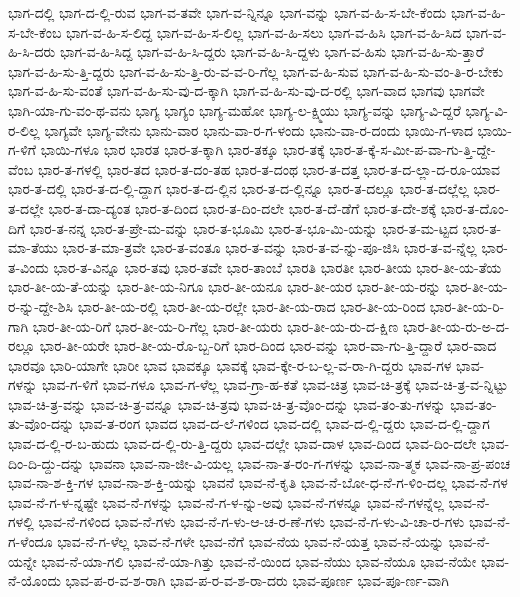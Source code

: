 {ಭಾಗ-ದಲ್ಲಿ
ಭಾಗ-ದ-ಲ್ಲಿ-ರುವ
ಭಾಗ-ವ-ತವೇ
ಭಾಗ-ವ-ನ್ನಿನ್ನೂ
ಭಾಗ-ವನ್ನು
ಭಾಗ-ವ-ಹಿ-ಸ-ಬೇ-ಕೆಂದು
ಭಾಗ-ವ-ಹಿ-ಸ-ಬೇ-ಕೆಂಬ
ಭಾಗ-ವ-ಹಿ-ಸ-ಲಿದ್ದ
ಭಾಗ-ವ-ಹಿ-ಸ-ಲಿಲ್ಲ
ಭಾಗ-ವ-ಹಿ-ಸಲು
ಭಾಗ-ವ-ಹಿಸಿ
ಭಾಗ-ವ-ಹಿ-ಸಿದ
ಭಾಗ-ವ-ಹಿ-ಸಿ-ದರು
ಭಾಗ-ವ-ಹಿ-ಸಿದ್ದ
ಭಾಗ-ವ-ಹಿ-ಸಿ-ದ್ದರು
ಭಾಗ-ವ-ಹಿ-ಸಿ-ದ್ದಳು
ಭಾಗ-ವ-ಹಿಸು
ಭಾಗ-ವ-ಹಿ-ಸು-ತ್ತಾರೆ
ಭಾಗ-ವ-ಹಿ-ಸು-ತ್ತಿ-ದ್ದರು
ಭಾಗ-ವ-ಹಿ-ಸು-ತ್ತಿ-ರು-ವ-ವ-ರಿ-ಗೆಲ್ಲ
ಭಾಗ-ವ-ಹಿ-ಸುವ
ಭಾಗ-ವ-ಹಿ-ಸು-ವಂ-ತಿ-ರ-ಬೇಕು
ಭಾಗ-ವ-ಹಿ-ಸು-ವಂತೆ
ಭಾಗ-ವ-ಹಿ-ಸು-ವು-ದ-ಕ್ಕಾಗಿ
ಭಾಗ-ವ-ಹಿ-ಸು-ವು-ದ-ರಲ್ಲಿ
ಭಾಗ-ವಾದ
ಭಾಗವು
ಭಾಗವೇ
ಭಾಗಿ-ಯಾ-ಗು-ವಂ-ಥ-ವನು
ಭಾಗ್ಯ
ಭಾಗ್ಯಂ
ಭಾಗ್ಯ-ಮಹೋ
ಭಾಗ್ಯ-ಲ-ಕ್ಷ್ಮಿಯು
ಭಾಗ್ಯ-ವನ್ನು
ಭಾಗ್ಯ-ವಿ-ದ್ದರೆ
ಭಾಗ್ಯ-ವಿ-ರ-ಲಿಲ್ಲ
ಭಾಗ್ಯವೇ
ಭಾಗ್ಯ-ವೇನು
ಭಾನು-ವಾರ
ಭಾನು-ವಾ-ರ-ಗ-ಳಂದು
ಭಾನು-ವಾ-ರ-ದಂದು
ಭಾಯಿ-ಗ-ಳಾದ
ಭಾಯಿ-ಗ-ಳಿಗೆ
ಭಾಯಿ-ಗಳೂ
ಭಾರ
ಭಾರತ
ಭಾರ-ತ-ಕ್ಕಾಗಿ
ಭಾರ-ತಕ್ಕೂ
ಭಾರ-ತಕ್ಕೆ
ಭಾರ-ತ-ಕ್ಕೆ-ಸ-ಮೀ-ಪ-ವಾ-ಗು-ತ್ತಿ-ದ್ದೇ-ವೆಂಬ
ಭಾರ-ತ-ಗಳಲ್ಲಿ
ಭಾರ-ತದ
ಭಾರ-ತ-ದಂ-ತಹ
ಭಾರ-ತ-ದಂಥ
ಭಾರ-ತ-ದತ್ತ
ಭಾರ-ತ-ದ-ಲ್ಲಾ-ದ-ರೂ-ಯಾವ
ಭಾರ-ತ-ದಲ್ಲಿ
ಭಾರ-ತ-ದ-ಲ್ಲಿ-ದ್ದಾಗ
ಭಾರ-ತ-ದ-ಲ್ಲಿನ
ಭಾರ-ತ-ದ-ಲ್ಲಿನ್ನೂ
ಭಾರ-ತ-ದಲ್ಲೂ
ಭಾರ-ತ-ದಲ್ಲೆಲ್ಲ
ಭಾರ-ತ-ದಲ್ಲೇ
ಭಾರ-ತ-ದಾ-ದ್ಯಂತ
ಭಾರ-ತ-ದಿಂದ
ಭಾರ-ತ-ದಿಂ-ದಲೇ
ಭಾರ-ತ-ದೆ-ಡೆಗೆ
ಭಾರ-ತ-ದೇ-ಶಕ್ಕೆ
ಭಾರ-ತ-ದೊಂ-ದಿಗೆ
ಭಾರ-ತ-ನನ್ನ
ಭಾರ-ತ-ಪ್ರೇ-ಮ-ವನ್ನು
ಭಾರ-ತ-ಭೂಮಿ
ಭಾರ-ತ-ಭೂ-ಮಿ-ಯನ್ನು
ಭಾರ-ತ-ಮ-ಟ್ಟದ
ಭಾರ-ತ-ಮಾ-ತೆಯು
ಭಾರ-ತ-ಮಾ-ತ್ರವೇ
ಭಾರ-ತ-ವಂತೂ
ಭಾರ-ತ-ವನ್ನು
ಭಾರ-ತ-ವ-ನ್ನು-ಪೂ-ಜಿಸಿ
ಭಾರ-ತ-ವ-ನ್ನೆಲ್ಲ
ಭಾರ-ತ-ವಿಂದು
ಭಾರ-ತ-ವಿನ್ನೂ
ಭಾರ-ತವು
ಭಾರ-ತವೇ
ಭಾರ-ತಾಂಬೆ
ಭಾರತಿ
ಭಾರತೀ
ಭಾರ-ತೀಯ
ಭಾರ-ತೀ-ಯ-ತೆಯ
ಭಾರ-ತೀ-ಯ-ತೆ-ಯನ್ನು
ಭಾರ-ತೀ-ಯ-ನಿಗೂ
ಭಾರ-ತೀ-ಯನೂ
ಭಾರ-ತೀ-ಯರ
ಭಾರ-ತೀ-ಯ-ರನ್ನು
ಭಾರ-ತೀ-ಯ-ರ-ನ್ನು-ದ್ದೇ-ಶಿಸಿ
ಭಾರ-ತೀ-ಯ-ರಲ್ಲಿ
ಭಾರ-ತೀ-ಯ-ರಲ್ಲೇ
ಭಾರ-ತೀ-ಯ-ರಾದ
ಭಾರ-ತೀ-ಯ-ರಿಂದ
ಭಾರ-ತೀ-ಯ-ರಿ-ಗಾಗಿ
ಭಾರ-ತೀ-ಯ-ರಿಗೆ
ಭಾರ-ತೀ-ಯ-ರಿ-ಗೆಲ್ಲ
ಭಾರ-ತೀ-ಯರು
ಭಾರ-ತೀ-ಯ-ರು-ದ-ಕ್ಷಿಣ
ಭಾರ-ತೀ-ಯ-ರು-ಅ-ದ-ರಲ್ಲೂ
ಭಾರ-ತೀ-ಯರೇ
ಭಾರ-ತೀ-ಯ-ರೊ-ಬ್ಬ-ರಿಗೆ
ಭಾರ-ದಿಂದ
ಭಾರ-ವನ್ನು
ಭಾರ-ವಾ-ಗು-ತ್ತಿ-ದ್ದಾರೆ
ಭಾರ-ವಾದ
ಭಾರವೂ
ಭಾರಿ-ಯಾಗೇ
ಭಾರೀ
ಭಾವ
ಭಾವಕ್ಕೂ
ಭಾವಕ್ಕೆ
ಭಾವ-ಕ್ಕೇ-ರ-ಬ-ಲ್ಲ-ವ-ರಾ-ಗಿ-ದ್ದರು
ಭಾವ-ಗಳ
ಭಾವ-ಗಳನ್ನು
ಭಾವ-ಗ-ಳಿಗೆ
ಭಾವ-ಗಳೂ
ಭಾವ-ಗ-ಳೆಲ್ಲ
ಭಾವ-ಗ್ರಾ-ಹ-ಕತೆ
ಭಾವ-ಚಿತ್ರ
ಭಾವ-ಚಿ-ತ್ರಕ್ಕೆ
ಭಾವ-ಚಿ-ತ್ರ-ವ-ನ್ನಿಟ್ಟು
ಭಾವ-ಚಿ-ತ್ರ-ವನ್ನು
ಭಾವ-ಚಿ-ತ್ರ-ವನ್ನೂ
ಭಾವ-ಚಿ-ತ್ರವು
ಭಾವ-ಚಿ-ತ್ರ-ವೊಂ-ದನ್ನು
ಭಾವ-ತಂ-ತು-ಗಳನ್ನು
ಭಾವ-ತಂ-ತು-ವೊಂ-ದನ್ನು
ಭಾವ-ತ-ರಂಗ
ಭಾವದ
ಭಾವ-ದ-ಲೆ-ಗಳಿಂದ
ಭಾವ-ದಲ್ಲಿ
ಭಾವ-ದ-ಲ್ಲಿ-ದ್ದರು
ಭಾವ-ದ-ಲ್ಲಿ-ದ್ದಾಗ
ಭಾವ-ದ-ಲ್ಲಿ-ರ-ಬ-ಹುದು
ಭಾವ-ದ-ಲ್ಲಿ-ರು-ತ್ತಿ-ದ್ದರು
ಭಾವ-ದಲ್ಲೇ
ಭಾವ-ದಾಳ
ಭಾವ-ದಿಂದ
ಭಾವ-ದಿಂ-ದಲೇ
ಭಾವ-ದಿಂ-ದಿ-ದ್ದು-ದನ್ನು
ಭಾವನಾ
ಭಾವ-ನಾ-ಜೀ-ವಿ-ಯಲ್ಲ
ಭಾವ-ನಾ-ತ-ರಂ-ಗ-ಗಳನ್ನು
ಭಾವ-ನಾ-ತ್ಮಕ
ಭಾವ-ನಾ-ಪ್ರ-ಪಂಚ
ಭಾವ-ನಾ-ಶ-ಕ್ತಿ-ಗಳ
ಭಾವ-ನಾ-ಶ-ಕ್ತಿ-ಯನ್ನು
ಭಾವನೆ
ಭಾವ-ನೆ-ಕೃತಿ
ಭಾವ-ನೆ-ಬೋ-ಧ-ನೆ-ಗ-ಳಿಂ-ದಲ್ಲ
ಭಾವ-ನೆ-ಗಳ
ಭಾವ-ನೆ-ಗ-ಳ-ನ್ನಷ್ಟೇ
ಭಾವ-ನೆ-ಗಳನ್ನು
ಭಾವ-ನೆ-ಗ-ಳ-ನ್ನು-ಅವು
ಭಾವ-ನೆ-ಗಳನ್ನೂ
ಭಾವ-ನೆ-ಗಳನ್ನೆಲ್ಲ
ಭಾವ-ನೆ-ಗಳಲ್ಲಿ
ಭಾವ-ನೆ-ಗಳಿಂದ
ಭಾವ-ನೆ-ಗಳು
ಭಾವ-ನೆ-ಗ-ಳು-ಆ-ಚ-ರ-ಣೆ-ಗಳು
ಭಾವ-ನೆ-ಗ-ಳು-ವಿ-ಚಾ-ರ-ಗಳು
ಭಾವ-ನೆ-ಗ-ಳೆಂದೂ
ಭಾವ-ನೆ-ಗ-ಳೆಲ್ಲ
ಭಾವ-ನೆ-ಗಳೇ
ಭಾವ-ನೆಗೆ
ಭಾವ-ನೆಯ
ಭಾವ-ನೆ-ಯತ್ತ
ಭಾವ-ನೆ-ಯನ್ನು
ಭಾವ-ನೆ-ಯನ್ನೇ
ಭಾವ-ನೆ-ಯಾ-ಗಲಿ
ಭಾವ-ನೆ-ಯಾ-ಗಿತ್ತು
ಭಾವ-ನೆ-ಯಿಂದ
ಭಾವ-ನೆಯು
ಭಾವ-ನೆಯೂ
ಭಾವ-ನೆಯೇ
ಭಾವ-ನೆ-ಯೊಂದು
ಭಾವ-ಪ-ರ-ವ-ಶ-ರಾಗಿ
ಭಾವ-ಪ-ರ-ವ-ಶ-ರಾ-ದರು
ಭಾವ-ಪೂರ್ಣ
ಭಾವ-ಪೂ-ರ್ಣ-ವಾಗಿ
}
